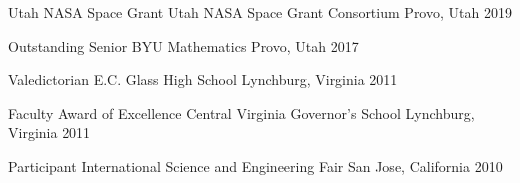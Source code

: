
\begin{cvhonors}

  \cvhonor
    {Utah NASA Space Grant} %
    {Utah NASA Space Grant Consortium} %
    {Provo, Utah} %
    {2019} %

  \cvhonor
    {Outstanding Senior} %
    {BYU Mathematics} %
    {Provo, Utah} %
    {2017} %

  \cvhonor
    {Valedictorian} %
    {E.C. Glass High School} %
    {Lynchburg, Virginia} %
    {2011} %

  \cvhonor
    {Faculty Award of Excellence} %
    {Central Virginia Governor's School} %
    {Lynchburg, Virginia} %
    {2011} %

  \cvhonor
    {Participant} %
    {International Science and Engineering Fair} %
    {San Jose, California} %
    {2010} %

\end{cvhonors}

